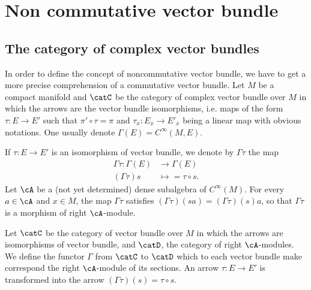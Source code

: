 


\section{Non commutative vector bundle}


					\subsection{The category of complex vector bundles}

In order to define the concept of noncommutative vector bundle, we have to get a more precise comprehension of a commutative vector bundle. Let $M$ be a compact manifold and $\catC$ be the category of complex vector bundle over $M$ in which the arrows are the vector bundle isomorphisms, i.e. maps of the form $\tau\colon E\to E'$ such that $\pi'\circ\tau=\pi$ and $\tau_x\colon E_x\to E'_x$ being a linear map with obvious notations. One usually denote $\Gamma(E)= C^{\infty}(M,E)$.

If $\tau\colon E\to E'$ is an isomorphism of vector bundle, we denote by $\Gamma\tau$ the map
\begin{equation}
\begin{aligned}
 \Gamma\tau\colon \Gamma(E)&\to \Gamma(E) \\ 
   (\Gamma\tau)s&\mapsto =\tau\circ s. 
\end{aligned}
\end{equation}
Let $\cA$ be a (not yet determined) dense subalgebra of $ C^{\infty}(M)$.
For every $a\in\cA$ and $x\in M$, the map $\Gamma\tau$ satisfies $(\Gamma\tau)(sa)=(\Gamma\tau)(s)a$, so that $\Gamma\tau$ is a morphism of right $\cA$-module.

Let $\catC$ be the category of vector bundle over $M$ in which the arrows are isomorphisms of vector bundle, and $\catD$, the category of right $\cA$-modules. We define the functor $\Gamma$ from $\catC$ to $\catD$ which to each vector bundle make correspond the right $\cA$-module of its sections. An arrow $\tau\colon E\to E'$ is transformed into the arrow $(\Gamma\tau)(s)=\tau\circ s$.

